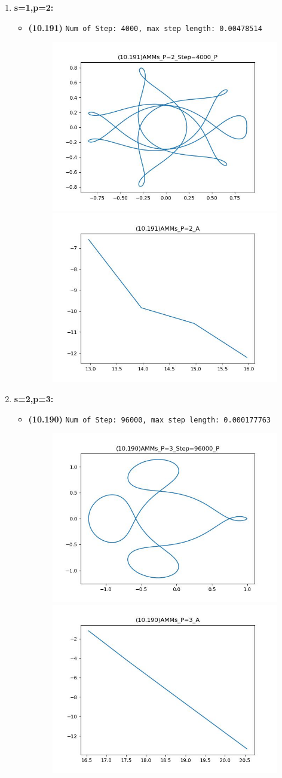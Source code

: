 \documentclass{article}
\begin{document}
\begin{enumerate}
    \item \textbf{s=1,p=2:}
    \begin{itemize}
        \item \textbf{(10.191)} \verb|Num of Step: 4000, max step length: 0.00478514|
        \begin{figure}[h]
            \centering
            \includegraphics[width = 0.45\linewidth]{(10.191)AMMs_P=2_Step=4000_P.jpg}
            \includegraphics[width = 0.45\linewidth]{(10.191)AMMs_P=2_A.jpg}
        \end{figure}
    \end{itemize}
    \newpage
    \item \textbf{s=2,p=3:}
    \begin{itemize}
        \item \textbf{(10.190)} \verb|Num of Step: 96000, max step length: 0.000177763|
        \begin{figure}[h]
            \centering
            \includegraphics[width = 0.45\linewidth]{(10.190)AMMs_P=3_Step=96000_P.jpg}
            \includegraphics[width = 0.45\linewidth]{(10.190)AMMs_P=3_A.jpg}

\end{figure}
\end{itemize}
\end{enumerate}
\end{document}
